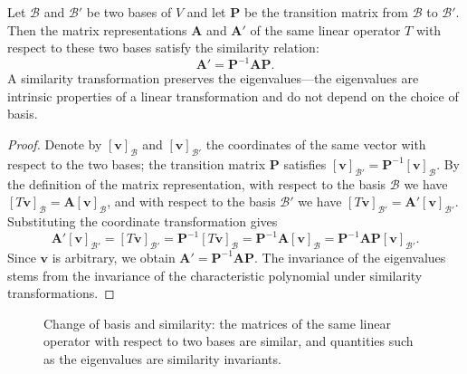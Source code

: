 \begin{proposition}\label{prop:change_of_basis}
Let $\mathcal{B}$ and $\mathcal{B}'$ be two bases of $V$ and let $\mathbf{P}$ be the transition matrix from $\mathcal{B}$ to $\mathcal{B}'$. Then the matrix representations $\mathbf{A}$ and $\mathbf{A}'$ of the same linear operator $T$ with respect to these two bases satisfy the similarity relation:
\[
\mathbf{A}' = \mathbf{P}^{-1} \mathbf{A} \mathbf{P}.
\]
A similarity transformation preserves the eigenvalues---the eigenvalues are intrinsic properties of a linear transformation and do not depend on the choice of basis.
\end{proposition}

\begin{proof}
Denote by $[\mathbf{v}]_{\mathcal{B}}$ and $[\mathbf{v}]_{\mathcal{B}'}$ the coordinates of the same vector with respect to the two bases; the transition matrix $\mathbf{P}$ satisfies $[\mathbf{v}]_{\mathcal{B}'} = \mathbf{P}^{-1}[\mathbf{v}]_{\mathcal{B}}$. By the definition of the matrix representation, with respect to the basis $\mathcal{B}$ we have $[T\mathbf{v}]_{\mathcal{B}} = \mathbf{A}[\mathbf{v}]_{\mathcal{B}}$, and with respect to the basis $\mathcal{B}'$ we have $[T\mathbf{v}]_{\mathcal{B}'} = \mathbf{A}'[\mathbf{v}]_{\mathcal{B}'}$. Substituting the coordinate transformation gives
\[
\mathbf{A}'[\mathbf{v}]_{\mathcal{B}'} = [T\mathbf{v}]_{\mathcal{B}'} = \mathbf{P}^{-1}[T\mathbf{v}]_{\mathcal{B}} = \mathbf{P}^{-1}\mathbf{A}[\mathbf{v}]_{\mathcal{B}} = \mathbf{P}^{-1}\mathbf{A}\mathbf{P}[\mathbf{v}]_{\mathcal{B}'}.
\]
Since $\mathbf{v}$ is arbitrary, we obtain $\mathbf{A}' = \mathbf{P}^{-1}\mathbf{A}\mathbf{P}$. The invariance of the eigenvalues stems from the invariance of the characteristic polynomial under similarity transformations.
\end{proof}

\begin{figure}[htbp]
\centering
{}
\caption{Change of basis and similarity: the matrices of the same linear operator with respect to two bases are similar, and quantities such as the eigenvalues are similarity invariants.}
\label{fig:change_of_basis}
\end{figure}


